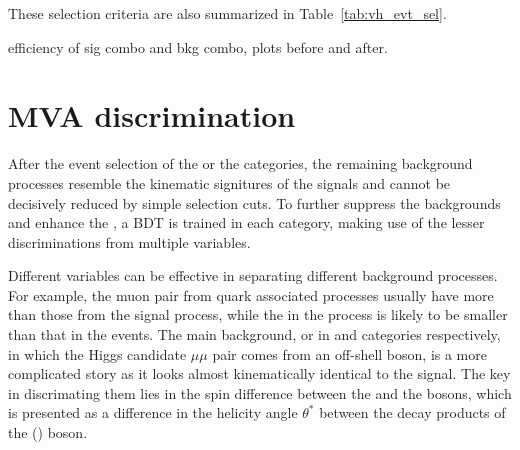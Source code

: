 These selection criteria are also summarized in Table~\ref{tab:vh_evt_sel}.
\begin{table}[!htb]
    \centering
    \captionsetup{justification=centering}
    \label{tab:vh_evt_sel}
\end{table}

efficiency of sig combo and bkg combo,
plots before and after.


\section{MVA discrimination}\label{sec:vh_bdt_cats}

After the event selection of the \WH or the \ZH categories, the remaining background processes 
resemble the kinematic signitures of the signals and cannot be decisively reduced by simple selection cuts.
To further suppress the backgrounds and enhance the \SoB, a BDT is trained in each category, 
making use of the lesser discriminations from multiple variables.

Different variables can be effective in separating different background processes.
For example, the muon pair from \Pqt quark associated processes usually have more \pt than those from the \WH signal process,
while the \MET in the \DY process is likely to be smaller than that in the \WH events.
The main background, \WZ or \ZZ in \WH and \ZH categories respectively, 
in which the Higgs candidate $\mu\mu$ pair comes from an off-shell \PZ boson,
is a more complicated story as it looks almost kinematically identical to the signal.  
The key in discrimating them lies in the spin difference between the \PZ and the \PH bosons,
which is presented as a difference in the helicity angle $\theta^{*}$ between the decay products of the \PZ (\PH) boson.

